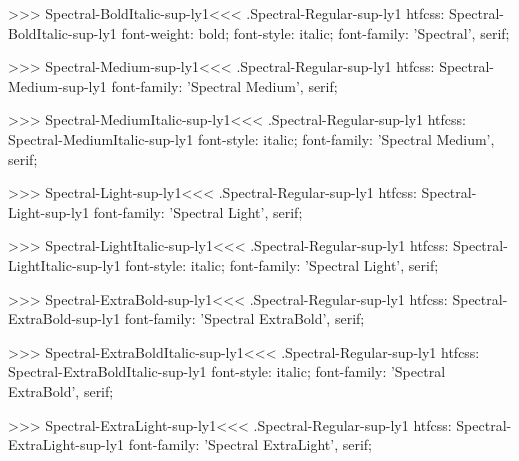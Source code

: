 >>>
\<Spectral-BoldItalic-sup-ly1\><<<
.Spectral-Regular-sup-ly1
htfcss:  Spectral-BoldItalic-sup-ly1  font-weight: bold; font-style: italic; font-family: 'Spectral', serif;

>>>
\<Spectral-Medium-sup-ly1\><<<
.Spectral-Regular-sup-ly1
htfcss:  Spectral-Medium-sup-ly1  font-family: 'Spectral Medium', serif;

>>>
\<Spectral-MediumItalic-sup-ly1\><<<
.Spectral-Regular-sup-ly1
htfcss:  Spectral-MediumItalic-sup-ly1  font-style: italic; font-family: 'Spectral Medium', serif;

>>>
\<Spectral-Light-sup-ly1\><<<
.Spectral-Regular-sup-ly1
htfcss:  Spectral-Light-sup-ly1  font-family: 'Spectral Light', serif;

>>>
\<Spectral-LightItalic-sup-ly1\><<<
.Spectral-Regular-sup-ly1
htfcss:  Spectral-LightItalic-sup-ly1  font-style: italic; font-family: 'Spectral Light', serif;

>>>
\<Spectral-ExtraBold-sup-ly1\><<<
.Spectral-Regular-sup-ly1
htfcss:  Spectral-ExtraBold-sup-ly1  font-family: 'Spectral ExtraBold', serif;

>>>
\<Spectral-ExtraBoldItalic-sup-ly1\><<<
.Spectral-Regular-sup-ly1
htfcss:  Spectral-ExtraBoldItalic-sup-ly1  font-style: italic; font-family: 'Spectral ExtraBold', serif;

>>>
\<Spectral-ExtraLight-sup-ly1\><<<
.Spectral-Regular-sup-ly1
htfcss:  Spectral-ExtraLight-sup-ly1  font-family: 'Spectral ExtraLight', serif;

